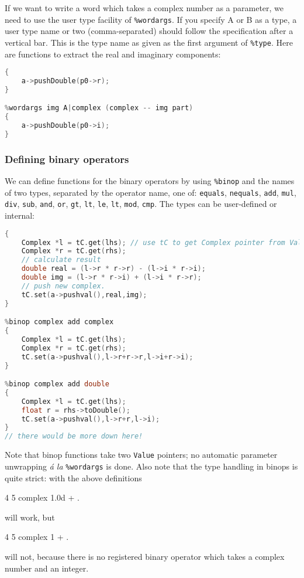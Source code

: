 If we want to write a word which takes a complex number as a parameter,
we need to use the user type facility of \texttt{\%wordargs}. If you
specify A or B as a type, a user type name or two (comma-separated) should
follow the specification after a vertical bar. This is the type
name as given as the first argument of \texttt{\%type}. Here are
functions to extract the real and imaginary components:
\begin{lstlisting}[language=c++]
%wordargs real A|complex (complex -- real part)
{
    a->pushDouble(p0->r);
}

%wordargs img A|complex (complex -- img part)
{
    a->pushDouble(p0->i);
}
\end{lstlisting}

\clearpage
\subsubsection{Defining binary operators}
We can define functions for the binary operators by using
\texttt{\%binop} and the names of two types, separated by the operator
name, one of: \texttt{equals}, \texttt{nequals}, \texttt{add}, \texttt{mul},
\texttt{div}, \texttt{sub}, \texttt{and}, \texttt{or}, \texttt{gt}, 
\texttt{lt}, \texttt{le}, \texttt{lt}, \texttt{mod}, \texttt{cmp}. 
The types can be user-defined or internal:
\begin{lstlisting}[language=c++]
%binop complex mul complex
{
    Complex *l = tC.get(lhs); // use tC to get Complex pointer from Value
    Complex *r = tC.get(rhs);
    // calculate result
    double real = (l->r * r->r) - (l->i * r->i);
    double img = (l->r * r->i) + (l->i * r->r);
    // push new complex.
    tC.set(a->pushval(),real,img);
}

%binop complex add complex
{
    Complex *l = tC.get(lhs);
    Complex *r = tC.get(rhs);
    tC.set(a->pushval(),l->r+r->r,l->i+r->i);
}

%binop complex add double
{
    Complex *l = tC.get(lhs);
    float r = rhs->toDouble();
    tC.set(a->pushval(),l->r+r,l->i);
}
// there would be more down here!
\end{lstlisting}
Note that binop functions take two \texttt{Value} pointers; no
automatic parameter unwrapping \emph{\'a la} \texttt{\%wordargs} is
done. Also note that the type handling in binops is quite strict:
with the above definitions
\begin{v}
4 5 complex 1.0d + .
\end{v}
will work, but
\begin{v}
4 5 complex 1 + .
\end{v}
will not, because there is no registered binary operator which
takes a complex number and an integer.
